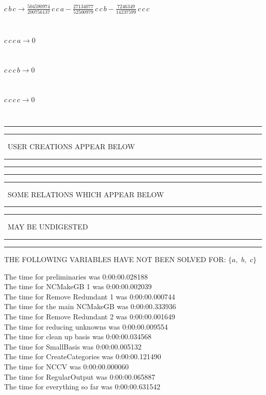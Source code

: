 \documentclass[rep10,leqno]{report}
\begin{document}
\begin{minipage}{6in}
$
c\,
 b\,
 c\rightarrow \frac{504590974}{200756137}\,
 c\,
 c\,
 a - \frac{27134077}{52500979}\,
 c\,
 c\,
 b - \frac{7246349}{14237599}\,
 c\,
 c\,
 c
$
\end{minipage}\medskip \\
\begin{minipage}{6in}
$
c\,
 c\,
 c\,
 a\rightarrow 0
$
\end{minipage}\medskip \\
\begin{minipage}{6in}
$
c\,
 c\,
 c\,
 b\rightarrow 0
$
\end{minipage}\medskip \\
\begin{minipage}{6in}
$
c\,
 c\,
 c\,
 c\rightarrow 0
$
\end{minipage}\\
\rule[2pt]{6in}{1pt}\hfil\break
\rule[2.5pt]{1.701in}{1pt}
\ USER CREATIONS APPEAR BELOW\ 
\rule[2.5pt]{1.701in}{1pt}\hfil\break
\rule[2pt]{6in}{1pt}\hfil\break
\rule[2pt]{6in}{4pt}\hfil\break
\rule[2pt]{1.45in}{4pt}
\ SOME RELATIONS WHICH APPEAR BELOW\ 
\rule[2pt]{1.45in}{4pt}\hfil\break
\rule[2pt]{2.18in}{4pt}
\ MAY BE UNDIGESTED\ 
\rule[2pt]{2.18in}{4pt}\hfil\break
\rule[2pt]{6in}{4pt}\hfil\break
THE FOLLOWING VARIABLES HAVE NOT BEEN SOLVED FOR:\hfil\break
$\{a,
$ $
b,
$ $
c\}$
\smallskip\\
\vspace{10pt}

\noindent
The time for preliminaries was 0:00:00.028188\\
The time for NCMakeGB 1 was 0:00:00.002039\\
The time for Remove Redundant 1 was 0:00:00.000744\\
The time for the main NCMakeGB was 0:00:00.333936\\
The time for Remove Redundant 2 was 0:00:00.001649\\
The time for reducing unknowns was 0:00:00.009554\\
The time for clean up basis was 0:00:00.034568\\
The time for SmallBasis was 0:00:00.005132\\
The time for CreateCategories was 0:00:00.121490\\
The time for NCCV was 0:00:00.000060\\
The time for RegularOutput was 0:00:00.065887\\
The time for everything so far was 0:00:00.631542\\
\end{document}
